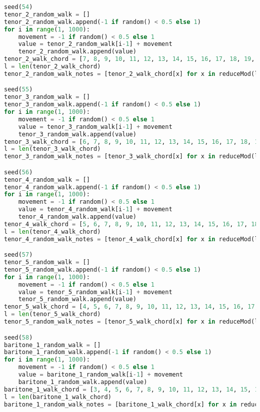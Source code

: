 \begin{lstlisting}[language=Python, caption=Invocation Source Code]
seed(54)
tenor_2_random_walk = []
tenor_2_random_walk.append(-1 if random() < 0.5 else 1)
for i in range(1, 1000):
    movement = -1 if random() < 0.5 else 1
    value = tenor_2_random_walk[i-1] + movement
    tenor_2_random_walk.append(value)
tenor_2_walk_chord = [7, 8, 9, 10, 11, 12, 13, 14, 15, 16, 17, 18, 19, 20, 21, 22, 21, 20, 19, 18, 17, 16, 15, 14, 13, 12, 11, 10, 9, 8, 7, 6, 5, 4, 3, 2, 1, 0, -1, -2, -1, 0, 1, 2, 3, 4, 5, 6, ]
l = len(tenor_2_walk_chord)
tenor_2_random_walk_notes = [tenor_2_walk_chord[x] for x in reduceMod(l, tenor_2_random_walk)]

seed(55)
tenor_3_random_walk = []
tenor_3_random_walk.append(-1 if random() < 0.5 else 1)
for i in range(1, 1000):
    movement = -1 if random() < 0.5 else 1
    value = tenor_3_random_walk[i-1] + movement
    tenor_3_random_walk.append(value)
tenor_3_walk_chord = [6, 7, 8, 9, 10, 11, 12, 13, 14, 15, 16, 17, 18, 19, 20, 21, 22, 21, 20, 19, 18, 17, 16, 15, 14, 13, 12, 11, 10, 9, 8, 7, 6, 5, 4, 3, 2, 1, 0, -1, -2, -1, 0, 1, 2, 3, 4, 5, ]
l = len(tenor_3_walk_chord)
tenor_3_random_walk_notes = [tenor_3_walk_chord[x] for x in reduceMod(l, tenor_3_random_walk)]

seed(56)
tenor_4_random_walk = []
tenor_4_random_walk.append(-1 if random() < 0.5 else 1)
for i in range(1, 1000):
    movement = -1 if random() < 0.5 else 1
    value = tenor_4_random_walk[i-1] + movement
    tenor_4_random_walk.append(value)
tenor_4_walk_chord = [5, 6, 7, 8, 9, 10, 11, 12, 13, 14, 15, 16, 17, 18, 19, 20, 21, 22, 21, 20, 19, 18, 17, 16, 15, 14, 13, 12, 11, 10, 9, 8, 7, 6, 5, 4, 3, 2, 1, 0, -1, -2, -1, 0, 1, 2, 3, 4, ]
l = len(tenor_4_walk_chord)
tenor_4_random_walk_notes = [tenor_4_walk_chord[x] for x in reduceMod(l, tenor_4_random_walk)]

seed(57)
tenor_5_random_walk = []
tenor_5_random_walk.append(-1 if random() < 0.5 else 1)
for i in range(1, 1000):
    movement = -1 if random() < 0.5 else 1
    value = tenor_5_random_walk[i-1] + movement
    tenor_5_random_walk.append(value)
tenor_5_walk_chord = [4, 5, 6, 7, 8, 9, 10, 11, 12, 13, 14, 15, 16, 17, 18, 19, 20, 21, 22, 21, 20, 19, 18, 17, 16, 15, 14, 13, 12, 11, 10, 9, 8, 7, 6, 5, 4, 3, 2, 1, 0, -1, -2, -1, 0, 1, 2, 3, ]
l = len(tenor_5_walk_chord)
tenor_5_random_walk_notes = [tenor_5_walk_chord[x] for x in reduceMod(l, tenor_5_random_walk)]

seed(58)
baritone_1_random_walk = []
baritone_1_random_walk.append(-1 if random() < 0.5 else 1)
for i in range(1, 1000):
    movement = -1 if random() < 0.5 else 1
    value = baritone_1_random_walk[i-1] + movement
    baritone_1_random_walk.append(value)
baritone_1_walk_chord = [3, 4, 5, 6, 7, 8, 9, 10, 11, 12, 13, 14, 15, 16, 17, 18, 19, 20, 21, 22, 21, 20, 19, 18, 17, 16, 15, 14, 13, 12, 11, 10, 9, 8, 7, 6, 5, 4, 3, 2, 1, 0, -1, -2, -1, 0, 1, 2, ]
l = len(baritone_1_walk_chord)
baritone_1_random_walk_notes = [baritone_1_walk_chord[x] for x in reduceMod(l, baritone_1_random_walk)]


\end{lstlisting}
